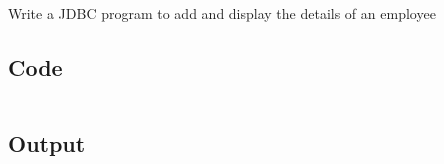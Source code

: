 \documentclass[../main.tex]{subfiles}
\begin{document}
Write a JDBC program to add and display the details of an employee

\subsection{Code}
\inputminted[frame=lines, breaklines, breakanywhere, numberblanklines=false]{java}{./programs/prog22/Employee.java}

\subsection{Output}
\end{document}
